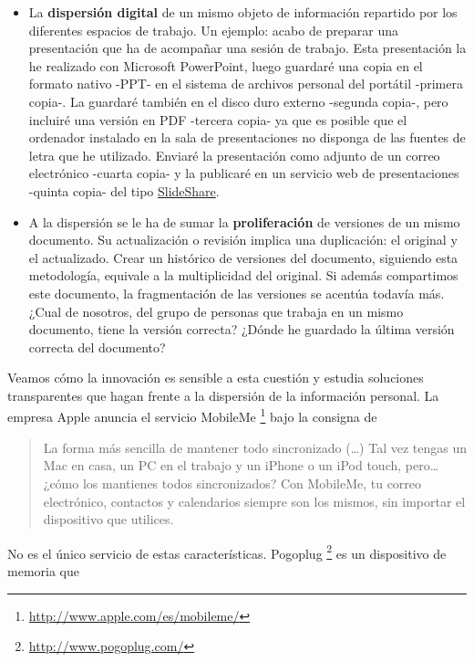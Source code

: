 \documentclass[12pt, a4paper,twoside]{book}
\begin{document}
\begin{itemize}
\item
  La \textbf{dispersión digital} de un mismo objeto de información
  repartido por los diferentes espacios de trabajo. Un ejemplo: acabo
  de preparar una presentación que ha de acompañar una sesión de
  trabajo. Esta presentación la he realizado con Microsoft
  PowerPoint, luego guardaré una copia en el formato nativo -PPT- en
  el sistema de archivos personal del portátil -primera copia-. La
  guardaré también en el disco duro externo -segunda copia-, pero
  incluiré una versión en PDF -tercera copia- ya que es posible que
  el ordenador instalado en la sala de presentaciones no disponga de
  las fuentes de letra que he utilizado. Enviaré la presentación como
  adjunto de un correo electrónico -cuarta copia- y la publicaré en
  un servicio web de presentaciones -quinta copia- del tipo
  \href{http://slideshare.ne}{SlideShare}.
\item
  A la dispersión se le ha de sumar la \textbf{proliferación} de
  versiones de un mismo documento. Su actualización o revisión
  implica una duplicación: el original y el actualizado. Crear un
  histórico de versiones del documento, siguiendo esta metodología,
  equivale a la multiplicidad del original. Si además compartimos
  este documento, la fragmentación de las versiones se acentúa
  todavía más. ¿Cual de nosotros, del grupo de personas que trabaja
  en un mismo documento, tiene la versión correcta? ¿Dónde he
  guardado la última versión correcta del documento?
\end{itemize}
Veamos cómo la innovación es sensible a esta cuestión y estudia
soluciones transparentes que hagan frente a la dispersión de la
información personal. La empresa Apple anuncia el servicio
MobileMe%
\footnote{\href{http://www.apple.com/es/mobileme/}{http://www.apple.com/es/mobileme/}}
bajo la consigna de

\begin{quote}
La forma más sencilla de mantener todo sincronizado (\ldots{}) Tal
vez tengas un Mac en casa, un PC en el trabajo y un iPhone o un
iPod touch, pero\ldots{} ¿cómo los mantienes todos sincronizados?
Con MobileMe, tu correo electrónico, contactos y calendarios
siempre son los mismos, sin importar el dispositivo que utilices.

\end{quote}
No es el único servicio de estas características. Pogoplug%
\footnote{\href{http://www.pogoplug.com/}{http://www.pogoplug.com/}}
es un dispositivo de memoria que
\end{document}
